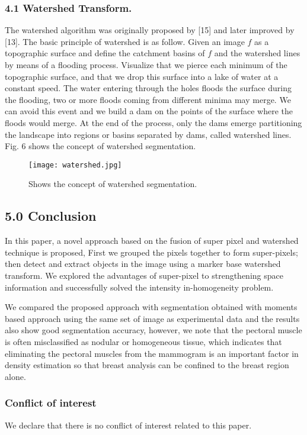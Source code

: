 \documentclass{article}
\begin{document}
{\subsubsection*{4.1 Watershed Transform.}
The watershed algorithm was originally proposed by [15] and later improved by [13]. The basic principle of watershed is as follow. Given an image $f$ as a topographic surface and define the catchment basins of $f$ and the watershed lines by means of a flooding process. Visualize that we pierce each minimum of the topographic surface, and that we drop this surface into a lake of water at a constant speed. The water entering through the holes floods the surface during the flooding, two or more floods coming from different minima may merge. We can avoid this event and we build a dam on the points of the surface where the floods would merge. At the end of the process, only the dams emerge partitioning the landscape into
regions or basins separated by dams, called watershed lines. Fig. 6 shows the concept of watershed segmentation.

	


\begin{figure}
\centering
\texttt{[image: watershed.jpg]}
\caption{Shows the concept of watershed segmentation.}
\end{figure}
  
 \subsection*{5.0 Conclusion}In this paper, a novel approach based on the fusion of super pixel and watershed technique is proposed, First we grouped the pixels together to form  super-pixels; then detect and extract objects in the image using a marker base watershed transform. We explored the advantages of super-pixel to strengthening space information and successfully solved the intensity in-homogeneity problem.
 
  We compared the proposed approach with segmentation obtained with moments based approach using the same set of image as experimental data and the results also show good segmentation accuracy, however, we note that the pectoral muscle is often misclassified as nodular or homogeneous tissue, which indicates that eliminating the pectoral muscles from the mammogram is an important factor in density estimation so that breast analysis can be confined to the breast region alone.
 
  \subsubsection*{Conflict of interest}
We declare that there is no conflict of interest related to this paper.


}
\end{document}
